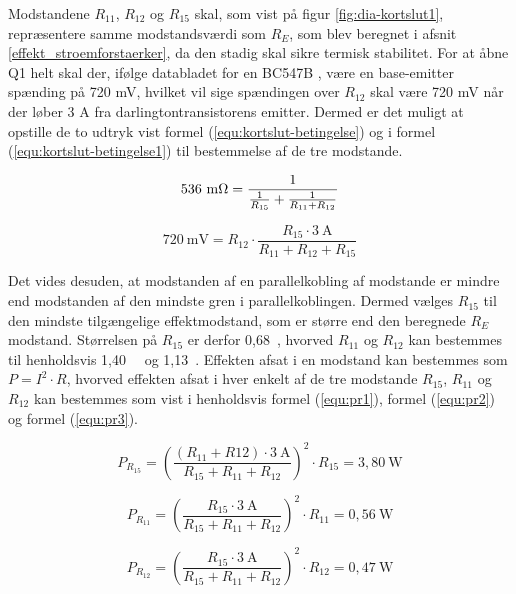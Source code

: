 Modstandene $R_{11}$, $R_{12}$ og $R_{15}$ skal, som vist på figur \ref{fig:dia-kortslut1}, repræsentere samme modstandsværdi som $R_E$, som blev beregnet i afsnit \ref{effekt_stroemforstaerker}, da den stadig skal sikre termisk stabilitet. For at åbne Q1 helt skal der, ifølge databladet for en BC547B \cite{bc547b-datablad}, være en base-emitter spænding på 720 mV, hvilket vil sige spændingen over $R_{12}$ skal være 720 mV når der løber 3 A fra darlingtontransistorens emitter. Dermed er det muligt at opstille de to udtryk vist formel (\ref{equ:kortslut-betingelse}) og i formel (\ref{equ:kortslut-betingelse1}) til bestemmelse af de tre modstande.

\begin{equation}
\label{equ:kortslut-betingelse}
\mathrm{536~m\ohm} = \frac{1}{\frac{1}{R_{15}}+\frac{1}{R_{11} + R_{12}}}
\end{equation}

\begin{equation}
\label{equ:kortslut-betingelse1}
\mathrm{720~mV} = R_{12} \cdot \frac{R_{15} \cdot \mathrm{3~A}}{R_{11} + R_{12} + R_{15}}
\end{equation}

Det vides desuden, at modstanden af en parallelkobling af modstande er mindre end modstanden af den mindste gren i parallelkoblingen. Dermed vælges $R_{15}$ til den mindste tilgængelige effektmodstand, som er større end den beregnede $R_E$ modstand. Størrelsen på $R_{15}$ er derfor 0,68~\ohm, hvorved $R_{11}$ og $R_{12}$ kan bestemmes til henholdsvis 1,40~\ohm~ og 1,13~\ohm. Effekten afsat i en modstand kan bestemmes som $P = I^2 \cdot R$, hvorved effekten afsat i hver enkelt af de tre modstande $R_{15}$, $R_{11}$ og $R_{12}$ kan bestemmes som vist i henholdsvis formel (\ref{equ:pr1}), formel (\ref{equ:pr2}) og formel (\ref{equ:pr3}).

\begin{equation}
\label{equ:pr1}
P_{R_{15}} = \left(\frac{(R_{11} + R{12}) \cdot \mathrm{3~A}}{R_{15} + R_{11} + R_{12}}\right)^2 \cdot R_{15} = \mathrm{3,80~W}
\end{equation}

\begin{equation}
\label{equ:pr2}
P_{R_{11}} = \left(\frac{R_{15} \cdot \mathrm{3~A}}{R_{15} + R_{11} + R_{12}}\right)^2 \cdot R_{11} = \mathrm{0,56~W}
\end{equation}

\begin{equation}
\label{equ:pr3}
P_{R_{12}} = \left(\frac{R_{15} \cdot \mathrm{3~A}}{R_{15} + R_{11} + R_{12}}\right)^2 \cdot R_{12} = \mathrm{0,47~W}
\end{equation}

